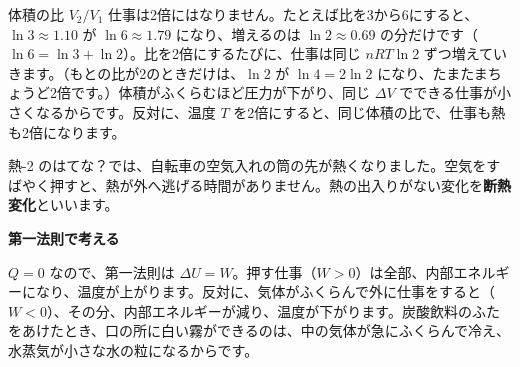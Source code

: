 \begin{bkfigure}
\label{ph:熱-3:fig-toon}
\end{bkfigure}

\begin{phbaisuru}{体積の比 $V_2/V_1$}
仕事は2倍にはなりません。たとえば比を3から6にすると、$\ln3\approx1.10$ が $\ln6\approx1.79$ になり、増えるのは $\ln2\approx0.69$ の分だけです（$\ln6=\ln3+\ln2$）。比を2倍にするたびに、仕事は同じ $nRT\ln2$ ずつ増えていきます。（もとの比が2のときだけは、$\ln2$ が $\ln4=2\ln2$ になり、たまたまちょうど2倍です。）体積がふくらむほど圧力が下がり、同じ $\Delta V$ でできる仕事が小さくなるからです。反対に、温度 $T$ を2倍にすると、同じ体積の比で、仕事も熱も2倍になります。
\end{phbaisuru}


\leavevmode\label{ph:熱-3:sec6}熱-2 のはてな？では、自転車の空気入れの筒の先が熱くなりました。空気をすばやく押すと、熱が外へ逃げる時間がありません。熱の出入りがない変化を\textbf{断熱変化}といいます。

\noindent\textbf{第一法則で考える}\par\nobreak
$Q=0$ なので、第一法則は $\Delta U=W$。押す仕事（$W>0$）は全部、内部エネルギーになり、温度が上がります。反対に、気体がふくらんで外に仕事をすると（$W<0$）、その分、内部エネルギーが減り、温度が下がります。炭酸飲料のふたをあけたとき、口の所に白い霧ができるのは、中の気体が急にふくらんで冷え、水蒸気が小さな水の粒になるからです。

